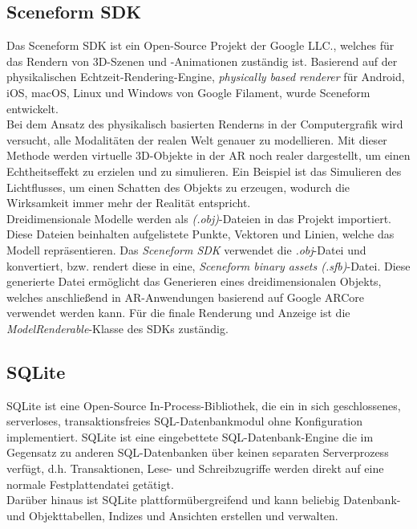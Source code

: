 \subsection{Sceneform SDK}
Das Sceneform \acs{SDK} ist ein Open-Source Projekt der Google LLC., welches für das Rendern von 3D-Szenen und -Animationen zuständig ist. 
Basierend auf der physikalischen Echtzeit-Rendering-Engine, \textit{physically based renderer} für Android, iOS, macOS, Linux und Windows 
von Google Filament, wurde Sceneform entwickelt. 
\\ 
\linebreak
Bei dem Ansatz des physikalisch basierten Renderns in der Computergrafik wird versucht, alle Modalitäten der realen Welt genauer zu modellieren. 
Mit dieser Methode werden virtuelle 3D-Objekte in der \acl{AR} noch realer dargestellt, um einen Echtheitseffekt zu erzielen und zu simulieren. 
Ein Beispiel ist das Simulieren des Lichtflusses, um einen Schatten des Objekts zu erzeugen, wodurch die Wirksamkeit immer mehr der Realität 
entspricht.
\\ 
\linebreak
Dreidimensionale Modelle werden als \textit{(.obj)}-Dateien in das Projekt importiert. Diese Dateien beinhalten aufgelistete Punkte, Vektoren 
und Linien, welche das Modell repräsentieren. Das \textit{Sceneform \acs{SDK}} verwendet die \textit{.obj}-Datei und konvertiert, bzw. 
rendert diese in eine, \textit{Sceneform binary assets (.sfb)}-Datei. Diese generierte Datei ermöglicht das Generieren eines dreidimensionalen 
Objekts, welches anschließend in \acs{AR}-Anwendungen basierend auf Google ARCore verwendet werden kann. 
Für die finale Renderung und Anzeige ist die \textit{ModelRenderable}-Klasse des \acs{SDK}s zuständig. 
\subsection{SQLite}
\acs{SQL}ite ist eine Open-Source In-Process-Bibliothek, die ein in sich geschlossenes, serverloses, transaktionsfreies \acs{SQL}-Datenbankmodul 
ohne Konfiguration implementiert. \acs{SQL}ite ist eine eingebettete \acs{SQL}-Datenbank-Engine die im Gegensatz zu anderen \acs{SQL}-Datenbanken über 
keinen separaten Serverprozess verfügt, d.h. Transaktionen, Lese- und Schreibzugriffe werden direkt auf eine normale Festplattendatei getätigt. \cite{sqlite.2018j}
\\
Darüber hinaus ist \acs{SQL}ite plattformübergreifend und kann beliebig Datenbank- und Objekttabellen, Indizes und Ansichten erstellen und verwalten. 